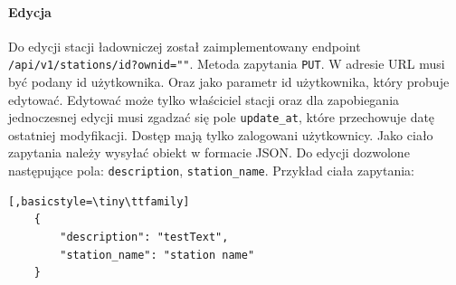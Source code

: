 \paragraph{Edycja}

Do edycji stacji ładowniczej został zaimplementowany endpoint \texttt{/api/v1/stations/{id}?ownid=""}.
Metoda zapytania \texttt{PUT}.
W adresie URL musi być podany id użytkownika. Oraz jako parametr id użytkownika, który probuje edytować. Edytować może tylko właściciel stacji oraz dla zapobiegania jednoczesnej edycji musi zgadzać się pole \texttt{update\_at}, które przechowuje datę ostatniej modyfikacji.
Dostęp mają tylko zalogowani użytkownicy.
Jako ciało zapytania należy wysyłać obiekt w formacie JSON. Do edycji dozwolone następujące pola: \texttt{description}, \texttt{station\_name}.
Przykład ciała zapytania:
\begin{lstlisting}[,basicstyle=\tiny\ttfamily]
    {
		"description": "testText",
		"station_name": "station name"
    }
\end{lstlisting}

